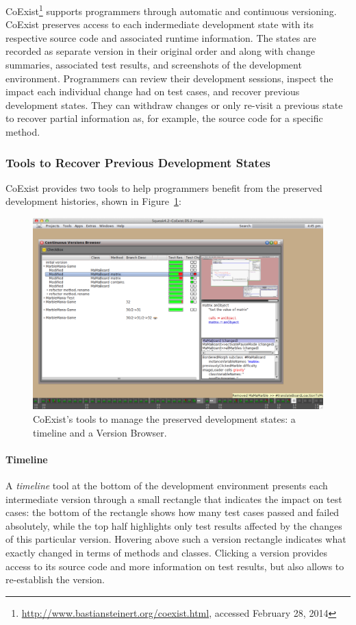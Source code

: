 CoExist\footnote{\url{http://www.bastiansteinert.org/coexist.html}, accessed February 28, 2014} supports programmers through automatic and continuous versioning.
CoExist preserves access to each indermediate development state with its respective source code and associated runtime information.
The states are recorded as separate version in their original order and along with change summaries, associated test results, and screenshots of the development environment.
Programmers can review their development sessions, inspect the impact each individual change had on test cases, and recover previous development states.
They can withdraw changes or only re-visit a previous state to recover partial information as, for example, the source code for a specific method.

\subsubsection{Tools to Recover Previous Development States}

CoExist provides two tools to help programmers benefit from the preserved development histories, shown in Figure~\ref{fig:CoExist}:

\begin{figure}[h]
    \centering
    \includegraphics[width=\textwidth]{figures/2_background/4_coexistTools.pdf}
    \caption{CoExist's tools to manage the preserved development states: a timeline and a Version Browser.}
    \label{fig:CoExist}
\end{figure}

\paragraph{Timeline}
A \emph{timeline} tool at the bottom of the development environment presents each intermediate version through a small rectangle that indicates the impact on test cases: the bottom of the rectangle shows how many test cases passed and failed absolutely, while the top half highlights only test results affected by the changes of this particular version.
Hovering above such a version rectangle indicates what exactly changed in terms of methods and classes.
Clicking a version provides access to its source code and more information on test results, but also allows to re-establish the version.

